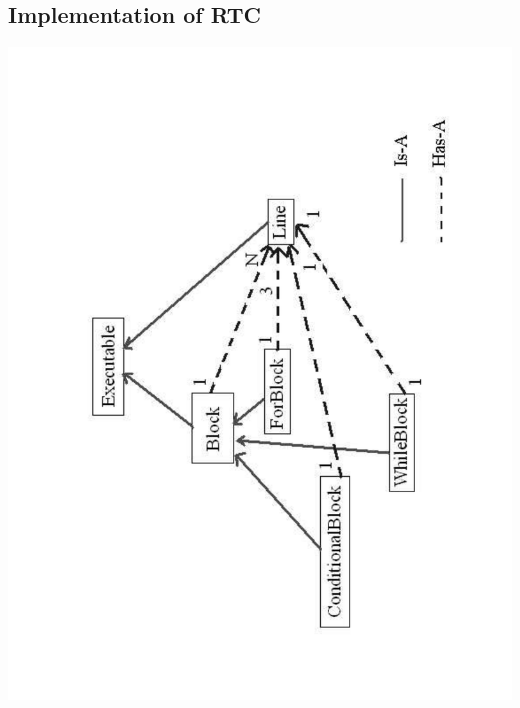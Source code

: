 \documentclass{article}
\begin{document}
\subsection{Implementation of RTC}

\begin{center}
\includegraphics[scale=0.36,angle=270]{diag1}

\end{center}
\end{document}
